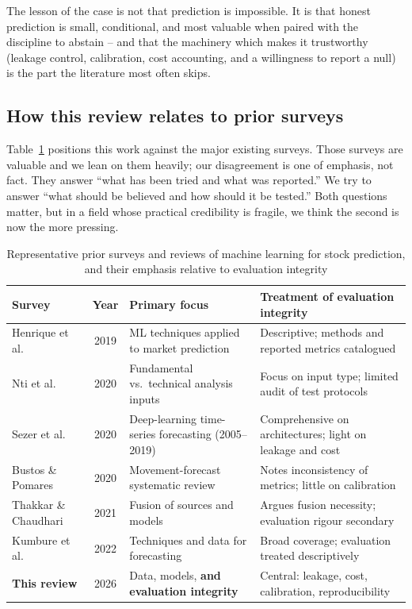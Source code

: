 \documentclass[10pt,a4paper,twocolumn]{article}
\begin{document}
The lesson of the case is not that prediction is impossible. It is that honest prediction is small, conditional, and most valuable when paired with the discipline to abstain -- and that the machinery which makes it trustworthy (leakage control, calibration, cost accounting, and a willingness to report a null) is the part the literature most often skips.

\subsection{How this review relates to prior surveys}

Table~\ref{tab:reviews} positions this work against the major existing surveys. Those surveys are valuable and we lean on them heavily; our disagreement is one of emphasis, not fact. They answer ``what has been tried and what was reported.'' We try to answer ``what should be believed and how should it be tested.'' Both questions matter, but in a field whose practical credibility is fragile, we think the second is now the more pressing.

\begin{table}[t]
\centering
\caption{Representative prior surveys and reviews of machine learning for stock prediction, and their emphasis relative to evaluation integrity}
\label{tab:reviews}
{\footnotesize
\begin{tabular}{p{3.4cm} c p{5.2cm} p{5.2cm}}
\toprule
\textbf{Survey} & \textbf{Year} & \textbf{Primary focus} & \textbf{Treatment of evaluation integrity} \\
\midrule
Henrique et al.\ \cite{henrique2019} & 2019 & ML techniques applied to market prediction & Descriptive; methods and reported metrics catalogued \\
Nti et al.\ \cite{nti2020} & 2020 & Fundamental vs.\ technical analysis inputs & Focus on input type; limited audit of test protocols \\
Sezer et al.\ \cite{sezer2020} & 2020 & Deep-learning time-series forecasting (2005--2019) & Comprehensive on architectures; light on leakage and cost \\
Bustos \& Pomares \cite{bustos2020} & 2020 & Movement-forecast systematic review & Notes inconsistency of metrics; little on calibration \\
Thakkar \& Chaudhari \cite{thakkar2021} & 2021 & Fusion of sources and models & Argues fusion necessity; evaluation rigour secondary \\
Kumbure et al.\ \cite{kumbure2022} & 2022 & Techniques and data for forecasting & Broad coverage; evaluation treated descriptively \\
\textbf{This review} & 2026 & Data, models, \textbf{and evaluation integrity} & Central: leakage, cost, calibration, reproducibility \\
\bottomrule
\end{tabular}}
\end{table}
\end{document}

